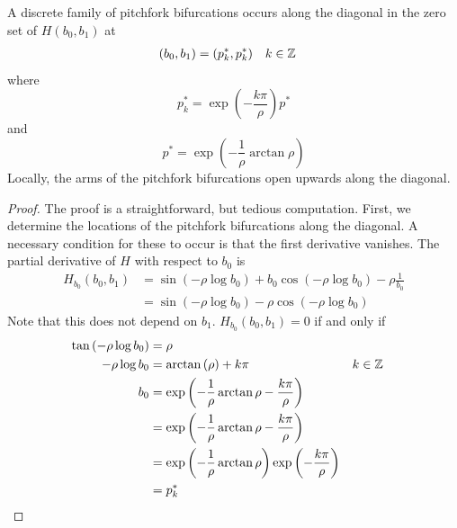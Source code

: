 \documentclass[thesis.tex]{subfiles}
\begin{document}
\begin{lemma}\label{pitchforkH}
A discrete family of pitchfork bifurcations occurs along the diagonal in the zero set of $H(b_0, b_1)$ at 
\begin{align*}
(b_0, b_1) &= (p_k^*, p_k^*) && k \in \mathbb{Z}
\end{align*}
where 
\begin{equation}\label{pkstar}
p^*_k = \exp\left(-\frac{k \pi}{\rho} \right) p^*
\end{equation}
and 
\begin{equation}\label{pstar}
p^* = \exp \left( -\frac{1}{\rho} \arctan \rho \right)
\end{equation}
Locally, the arms of the pitchfork bifurcations open upwards along the diagonal.
\begin{proof}
The proof is a straightforward, but tedious computation. First, we determine the locations of the pitchfork bifurcations along the diagonal. A necessary condition for these to occur is that the first derivative vanishes. The partial derivative of $H$ with respect to $b_0$ is
\begin{align*}
H_{b_0}(b_0, b_1) &= 
\sin \left( -\rho \log b_0 \right)
+ b_0 \cos \left( - \rho \log b_0 \right)- \rho \frac{1}{b_0} \\
&= \sin \left( - \rho \log b_0 \right) - \rho \cos \left( - \rho \log b_0 \right)
\end{align*}
Note that this does not depend on $b_1$. $H_{b_0}(b_0, b_1) = 0$ if and only if
\begin{align*}
\tan \left( -\rho \log b_0 \right) &=  \rho \\
-\rho \log b_0 &= \arctan \left( \rho\right) + k \pi && k \in \mathbb{Z} \\ 
b_0 &= \mathop\mathrm{exp}\nolimits \left( -\frac{1}{\rho} \arctan \rho - \frac{k \pi}{\rho} \right) \\
&= \mathop\mathrm{exp}\nolimits \left( -\frac{1}{\rho} \arctan \rho - \frac{k \pi}{\rho} \right)  \\
&= \mathop\mathrm{exp}\nolimits \left( -\frac{1}{\rho} \arctan \rho \right) \mathop\mathrm{exp}\nolimits \left( - \frac{k \pi}{\rho} \right) \\
&= p_k^*
\end{align*}


\end{proof}
\end{lemma}
\end{document}
